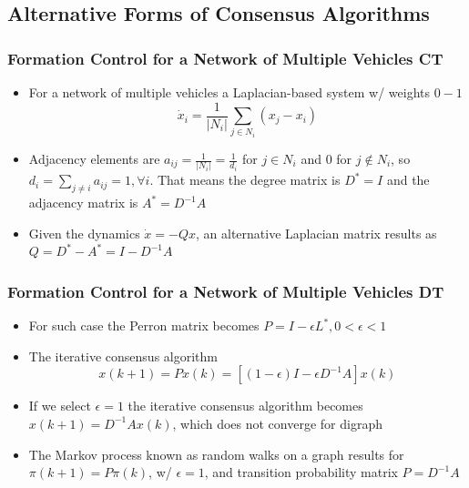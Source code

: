 \documentclass{beamer}
\begin{document}
\subsection{Alternative Forms of Consensus Algorithms}

\begin{frame}
\frametitle{Formation Control for a Network of Multiple Vehicles CT }
\begin{itemize}
\item For a network of multiple vehicles a Laplacian-based system w/ weights $0-1$
\begin{equation*}
\dot{x}_i=\frac{1}{|N_i|}\sum_{j\in N_i}(x_j-x_i)
\end{equation*}
\item Adjacency elements are $a_{ij}=\frac{1}{|N_i|}=\frac{1}{d_i}$ for $j\in N_i$ and $0$  for $j\notin N_i$, so $d_i=\sum_{j\neq i}a_{ij}=1, \forall i$. That means the degree matrix is $D^{\ast}=I$ and the adjacency matrix is $A^{\ast}=D^{-1}A$
\item Given the dynamics $\dot{x}=-Qx$, an alternative Laplacian matrix results as $Q=D^{\ast}-A^{\ast}=I-D^{-1}A$
\end{itemize}
\end{frame}


\begin{frame}
\frametitle{Formation Control for a Network of Multiple Vehicles DT}
\begin{itemize}
\item For such case the Perron matrix becomes $P=I-\epsilon L^{\ast}, 0<\epsilon <1$
\item The iterative consensus algorithm 
\begin{equation*}
x(k+1)=Px(k)=[(1-\epsilon )I-\epsilon D^{-1}A]x(k)
\end{equation*}
\item If we select $\epsilon =1$ the iterative consensus algorithm becomes $x(k+1)=D^{-1}Ax(k)$, which does not converge for digraph
\item The Markov process known as random walks on a graph results for $\pi(k+1)=P\pi(k)$, w/ $\epsilon = 1$, and transition probability matrix $P=D^{-1}A$
\end{itemize}
\end{frame}

\end{document}
